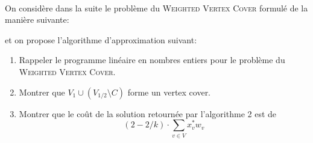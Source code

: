 \begin{td-exo}\,\\ %
	On considère dans la suite le problème du \textsc{Weighted Vertex Cover} formulé de la manière suivante:

	

	et on propose l'algorithme d'approximation suivant:

	

	\begin{enumerate}
		\item Rappeler le programme linéaire en nombres entiers pour le problème du \textsc{Weighted Vertex Cover}.

		\item Montrer que \(V_1 \cup \left( V_{1/2} \setminus C\right)\) forme un vertex cover.

		\item Montrer que le coût de la solution retournée par l'algorithme 2 est de %
		\begin{equation*}
			\left(2 - 2/k\right) \cdot \sum_{v\in V} x^\ast_v w_v
		\end{equation*}
	\end{enumerate}
\end{td-exo}

